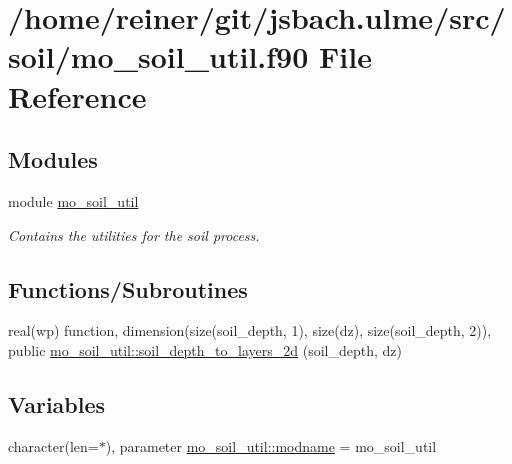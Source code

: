 \hypertarget{mo__soil__util_8f90}{}\section{/home/reiner/git/jsbach.ulme/src/soil/mo\+\_\+soil\+\_\+util.f90 File Reference}
\label{mo__soil__util_8f90}
\subsection*{Modules}
\begin{DoxyCompactItemize}
\item 
module \hyperlink{namespacemo__soil__util}{mo\+\_\+soil\+\_\+util}
\begin{DoxyCompactList}\small\item\em Contains the utilities for the soil process. \end{DoxyCompactList}\end{DoxyCompactItemize}
\subsection*{Functions/\+Subroutines}
\begin{DoxyCompactItemize}
\item 
real(wp) function, dimension(size(soil\+\_\+depth, 1), size(dz), size(soil\+\_\+depth, 2)), public \hyperlink{namespacemo__soil__util_ad78dd96d8e36c528df761c9769302d5f}{mo\+\_\+soil\+\_\+util\+::soil\+\_\+depth\+\_\+to\+\_\+layers\+\_\+2d} (soil\+\_\+depth, dz)
\end{DoxyCompactItemize}
\subsection*{Variables}
\begin{DoxyCompactItemize}
\item 
character(len=$\ast$), parameter \hyperlink{namespacemo__soil__util_aab312ec886be3b630752b30c016b5206}{mo\+\_\+soil\+\_\+util\+::modname} = \textquotesingle{}mo\+\_\+soil\+\_\+util\textquotesingle{}
\end{DoxyCompactItemize}
